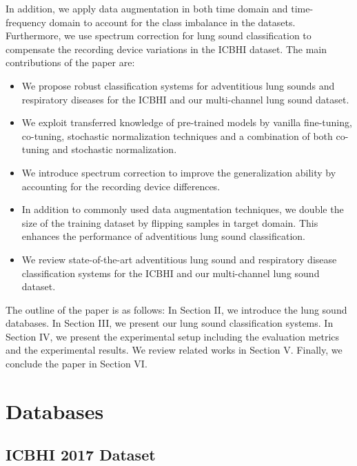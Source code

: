 \documentclass[journal]{IEEEtran}
\begin{document}
In addition,  we apply data augmentation in both time domain and time-frequency domain to account for the class imbalance in the datasets. Furthermore, we use spectrum correction for lung sound classification to compensate the recording device variations in the ICBHI dataset. The main contributions of the paper are:
\begin{itemize}
    \item We propose robust classification systems for adventitious lung sounds and respiratory diseases for the ICBHI and our multi-channel lung sound dataset.
	\item We exploit transferred knowledge of pre-trained models by vanilla fine-tuning, co-tuning, stochastic normalization techniques and a combination of both co-tuning and stochastic normalization.
	\item We introduce spectrum correction to improve the generalization ability by accounting for the recording device differences.
	\item In addition to commonly used data augmentation techniques, we double the size of the training dataset by flipping samples in target domain. This enhances the performance of adventitious lung sound classification.
	\item We review state-of-the-art adventitious lung sound and respiratory disease classification systems for the ICBHI and our multi-channel lung sound dataset.
\end{itemize}

The outline of the paper is as follows: In Section II, we introduce the lung sound databases. In Section III, we present our lung sound classification systems. In Section IV, we present the experimental setup including the evaluation metrics and the experimental results. We review related works in Section V. Finally, we conclude the paper in Section VI.

\section{Databases}
\subsection{ICBHI 2017 Dataset}
\end{document}
